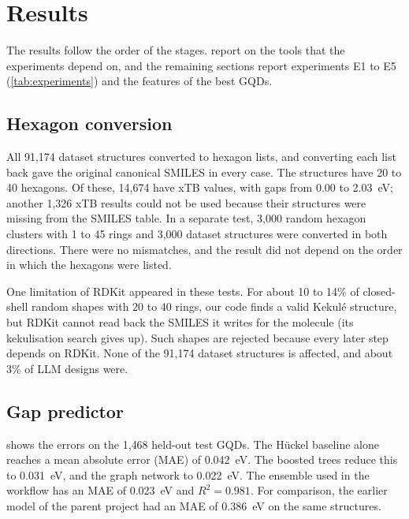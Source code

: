 \chapter{Results}
\label{ch:results}

The results follow the order of the stages.  report on the
tools that the experiments depend on, and the remaining sections report experiments E1 to E5
(\cref{tab:experiments}) and the features of the best GQDs.

\section{Hexagon conversion}
\label{sec:res-hex}

All 91{,}174 dataset structures converted to hexagon lists, and converting each list back gave the
original canonical SMILES in every case. The structures have 20 to 40 hexagons. Of these,
14{,}674 have xTB values, with gaps from 0.00 to 2.03~eV; another 1{,}326 xTB results could not be
used because their structures were missing from the SMILES table. In a separate test, 3{,}000
random hexagon clusters with 1 to 45 rings and 3{,}000 dataset structures were converted in both
directions. There were no mismatches, and the result did not depend on the order in which the
hexagons were listed.

One limitation of RDKit appeared in these tests. For about 10 to 14\% of closed-shell random shapes
with 20 to 40 rings, our code finds a valid Kekul\'e structure, but RDKit cannot read back the
SMILES it writes for the molecule (its kekulisation search gives up). Such shapes are rejected
because every later step depends on RDKit. None of the 91{,}174 dataset structures is affected,
and about 3\% of LLM designs were.

\section{Gap predictor}
\label{sec:res-predictor}

 shows the errors on the 1{,}468 held-out test GQDs. The H\"uckel baseline
alone reaches a mean absolute error (MAE) of 0.042~eV. The boosted trees reduce this to 0.031~eV,
and the graph network to 0.022~eV. The ensemble used in the workflow has an MAE of 0.023~eV and
\(R^2 = 0.981\). For comparison, the earlier model of the parent project had an MAE of 0.386~eV on
the same structures.

